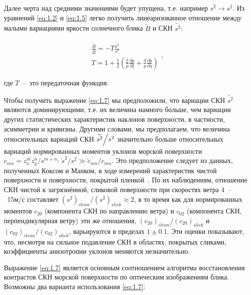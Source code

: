 Далее черта над средними значениями будет упущена, т.е. например $\overline{s^{2} }\to s^{2} $. Из уравнений \eqref{eq:1.2} и \eqref{eq:1.5} легко получить линеаризованное отношение между малыми вариациями яркости солнечного блика $\tilde{B}$ и СКН $\widetilde{s^{2} }$:


\begin{equation} \label{eq:1.7} 
	\begin{array}{l} {\frac{\tilde{B}}{\overline{B}} =-T\frac{\widetilde{s^{2} }}{s^{2} } }
	\\
	{T = 1+\frac{1}{2} \left(\frac{\xi }{p} \frac{\partial p}{\partial \xi } +\frac{\eta }{p} \frac{\partial p}{\partial \eta } \right)}
	\end{array}, 
\end{equation} 


\noindent где $T$~--~это передаточная функция.

Чтобы получить выражение \eqref{eq:1.7} мы предположили, что вариации СКН $\widetilde{s^{2} }$ являются доминирующими, т.е. их величина намного больше, чем вариации других статистических характеристик наклонов поверхности, в частности, асимметрии и кривизны. Другими словами, мы предполагаем, что величина относительных вариаций СКН ${\widetilde{s^{2} }\mathord{\left/ {\vphantom {\widetilde{s^{2} } s^{2} }} \right. \kern-\nulldelimiterspace} s^{2} } $ значительно больше относительных вариаций нормированных моментов уклонов морской поверхности $c_{mn} =\overline{z_{x}^{m} z_{y}^{n} }/s^{m+n} $: $\tilde{s}^{2} /s^{2} \gg \tilde{c}_{mn} /c_{mn} $. Это предположение следует из данных, полученных Коксом и Манком, в ходе измерений характеристик чистой поверхности и поверхности, покрытой пленкой~\citep{Cox1954, Cox1954a}. По их наблюдениям, отношение СКН чистой к загрязнённой, сликовой поверхности при скоростях ветра 4~--~15м/с составляет $(s^{2} )_{clean} /(s^{2} )_{slick} \approx 2$, в то время как для нормированных моментов $c_{20} $ (компонента СКН по направлению ветра) и $c_{02} $ (компонента СКН, перпендикулярная ветру) эти же отношения, $(c_{20} )_{clean} /(c_{20} )_{slick} $ и $(c_{02} )_{clean} /(c_{02} )_{slick} $, варьируются в пределах $1\pm 0.1$. Эти оценки показывают, что, несмотря на сильное подавление СКН в областях, покрытых сликами, коэффициенты анизотропии уклонов меняются незначительно.

Выражение \eqref{eq:1.7} является основным соотношением алгоритма восстановления контрастов СКН морской поверхности по оптическим изображениям блика. Возможны два варианта использования \eqref{eq:1.7}:

